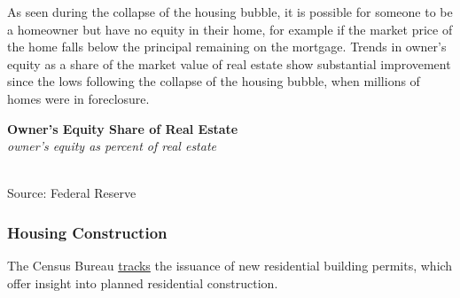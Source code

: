 \documentclass{report}
\makeatletter
\newcommand{\tbllink}[1]{\href{https://raw.githubusercontent.com/bdecon/US-chartbook/master/chartbook/data/#1}{\faTable}}
\newcommand*\short[1]{\expandafter\@gobbletwo\number\numexpr#1\relax}
\newcommand{\shdateaxisticks}{
		date coordinates in=x, axis line style={draw=none},
		xmax={2022-01-30},
		max space between ticks=40,	    
		xtick={{1990-01-01}, {1995-01-01}, {2000-01-01}, 
			{2005-01-01}, {2010-01-01}, {2015-01-01}, {2020-01-01}},
		minor xtick={},
		enlarge y limits={0.06}, enlarge x limits={0.01},
		}
\newcommand{\stdline}[4]{\addplot[very thick, no markers, color=#1] 
		table [x=#2, y=#3, col sep=comma] {#4};	}
\newcommand{\rbars}{
		\fill[color=black!10] (axis cs:{1990-07-01},\pgfkeysvalueof{/pgfplots/ymin}) rectangle 
			(axis cs:{1991-03-01}, \pgfkeysvalueof{/pgfplots/ymax});
		\fill[color=black!10] (axis cs:{2007-12-01},\pgfkeysvalueof{/pgfplots/ymin}) rectangle 
			(axis cs:{2009-07-01}, \pgfkeysvalueof{/pgfplots/ymax});
		\fill[color=black!10] (axis cs:{2001-03-01},\pgfkeysvalueof{/pgfplots/ymin}) rectangle 
			(axis cs:{2001-11-01}, \pgfkeysvalueof{/pgfplots/ymax});
		\fill[color=black!10] (axis cs:{2020-02-01},\pgfkeysvalueof{/pgfplots/ymin}) rectangle 
			(axis cs:{2020-05-01}, \pgfkeysvalueof{/pgfplots/ymax});}
\makeatother
\begin{document}
{\begin{minipage}{0.76\textwidth}
As seen during the collapse of the housing bubble, it is possible for someone to be a homeowner but have no equity in their home, for example if the market price of the home falls below the principal remaining on the mortgage. Trends in owner's equity as a share of the market value of real estate show substantial improvement since the lows following the collapse of the housing bubble, when millions of homes were in foreclosure. 
\end{minipage}
\vspace{1mm}

\begin{minipage}{0.29\textwidth}
\small 
\end{minipage}\hspace{7mm}
\begin{minipage}{0.46\textwidth}
\normalsize \textbf{Owner's Equity Share of Real Estate}\\
\footnotesize{\textit{owner's equity as percent of real estate}}\\
\hspace*{-2mm} \\
\footnotesize{Source: Federal Reserve} \hspace{30mm} \tbllink{homeeq.csv} 

\end{minipage}
\newpage
\begin{minipage}{0.76\textwidth}
\subsubsection*{\color{black!70} \seriffont Housing Construction}
\small The Census Bureau \href{https://www.census.gov/construction/bps/}{tracks} the issuance of new residential building permits, which offer insight into planned residential construction. 
\vspace{1mm}


\end{minipage}}
\end{document}
